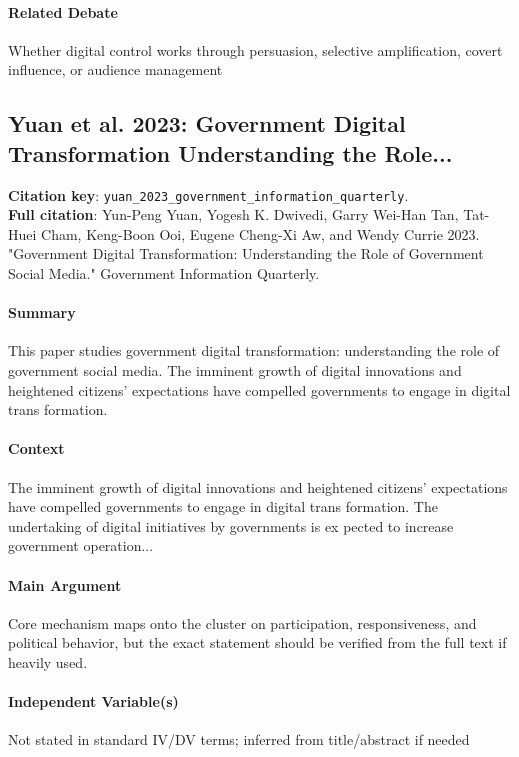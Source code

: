 \documentclass[12pt]{article}
\begin{document}
\paragraph{Related Debate} Whether digital control works through persuasion, selective amplification, covert influence, or audience management


\subsection{Yuan et al. 2023: Government Digital Transformation Understanding the Role...}
\textbf{Citation key}: \texttt{yuan\_2023\_government\_information\_quarterly}.\\
\textbf{Full citation}: Yun-Peng Yuan, Yogesh K. Dwivedi, Garry Wei-Han Tan, Tat-Huei Cham, Keng-Boon Ooi, Eugene Cheng-Xi Aw, and Wendy Currie 2023. "Government Digital Transformation: Understanding the Role of Government Social Media." Government Information Quarterly.

\paragraph{Summary} This paper studies government digital transformation: understanding the role of government social media. The imminent growth of digital innovations and heightened citizens' expectations have compelled governments to engage in digital trans formation.

\paragraph{Context} The imminent growth of digital innovations and heightened citizens' expectations have compelled governments to engage in digital trans formation. The undertaking of digital initiatives by governments is ex pected to increase government operation...

\paragraph{Main Argument} Core mechanism maps onto the cluster on participation, responsiveness, and political behavior, but the exact statement should be verified from the full text if heavily used.

\paragraph{Independent Variable(s)} Not stated in standard IV/DV terms; inferred from title/abstract if needed
\end{document}
